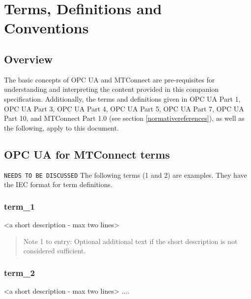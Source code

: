 \section{Terms, Definitions and Conventions}\label{termsdefinitionsconventions}

\subsection{Overview}

The basic concepts of OPC UA and MTConnect are pre-requisites for understanding and interpreting the content provided in this companion specification. Additionally, the terms and definitions given in OPC UA Part 1, OPC UA Part 3, OPC UA Part 4, OPC UA Part 5, OPC UA Part 7, OPC UA Part 10, and MTConnect Part 1.0 (see section \ref{normativereferences}), as well as the following, apply to this document. 


\subsection{OPC UA for MTConnect terms}

\texttt{NEEDS TO BE DISCUSSED}
The following terms (1 and 2) are examples. They have the IEC format for term definitions.

\subsubsection{term\_1}
<a short description - max two lines>

\begin{quote}
\footnotesize
Note 1 to entry: Optional additional text if the short description is not considered sufficient.
\end{quote}

\subsubsection{term\_2}
<a short description - max two lines>
....


